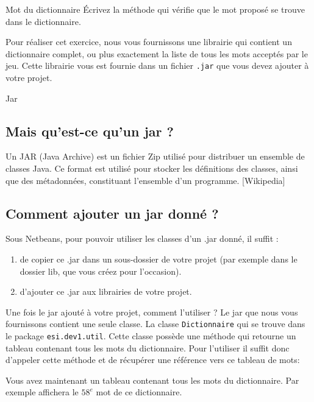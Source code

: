 \documentclass[a4paper,11pt]{style-esi/td}
\begin{document}
 	\begin{Exercice}{Mot du dictionnaire}
 	 			\'Ecrivez la méthode 
		qui vérifie que le mot proposé se trouve dans le dictionnaire.
				
		Pour réaliser cet exercice, nous vous fournissons une librairie qui contient 
		un dictionnaire complet, ou plus exactement la liste de tous les mots
		acceptés par le jeu. Cette librairie vous est fournie dans un fichier
		 \texttt{.jar} que vous devez ajouter à votre projet.	
		 
		\begin{infoit}{Jar}	
		\subsection*{Mais qu’est-ce qu’un jar ?}
			Un JAR (Java Archive) est un fichier Zip utilisé pour distribuer un 
			ensemble de classes Java. Ce format est utilisé pour stocker les 
			définitions des classes, ainsi que des métadonnées, constituant 
			l’ensemble d’un programme. [Wikipedia]
		
		\medskip
		\subsection*{Comment ajouter un jar donné ?}
			Sous Netbeans, pour pouvoir utiliser les classes d’un .jar donné, il suffit :
			\begin{enumerate}
				\item de copier ce .jar dans un sous-dossier de votre projet (par exemple
					dans le dossier lib, que vous créez pour l’occasion).
				\item d’ajouter ce .jar aux librairies de votre projet.
			\end{enumerate}
		\end{infoit}	

	Une fois le jar ajouté à votre projet, comment l'utiliser ?
			Le jar que nous vous fournissons contient une seule classe.
			La classe \texttt{Dictionnaire} qui se trouve dans le package 
			\texttt{esi.dev1.util}. Cette classe possède une méthode 
			 qui retourne un tableau contenant tous les mots
			du dictionnaire. Pour l'utiliser il suffit donc d'appeler cette méthode
			et de récupérer une référence vers ce tableau de mots:
			
			
			Vous avez maintenant un tableau contenant tous les mots du dictionnaire.
			Par exemple  affichera 
			le $58^e$ mot de ce dictionnaire.

			
	\end{Exercice} 
\end{document}
